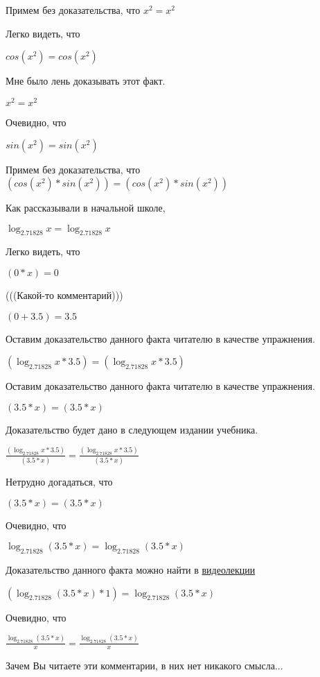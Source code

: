 \documentclass[12pt,a4paper,fleqn]{article}
\theoremstyle{definition}
\begin{document}
Примем без доказательства, что
${ x }^{ 2 } = { x }^{ 2 }$

Легко видеть, что

$cos({ x }^{ 2 }) = cos({ x }^{ 2 })$

Мне было лень доказывать этот факт.

${ x }^{ 2 } = { x }^{ 2 }$

Очевидно, что

$sin({ x }^{ 2 }) = sin({ x }^{ 2 })$

Примем без доказательства, что
$(cos({ x }^{ 2 }) * sin({ x }^{ 2 })) = (cos({ x }^{ 2 }) * sin({ x }^{ 2 }))$

Как рассказывали в начальной школе,

$\log_{ 2.71828 }{ x } = \log_{ 2.71828 }{ x }$

Легко видеть, что

$( 0  *  x ) =  0 $

(((Какой-то комментарий)))

$( 0  +  3.5 ) =  3.5 $

Оставим доказательство данного факта читателю в качестве упражнения.

$(\log_{ 2.71828 }{ x } *  3.5 ) = (\log_{ 2.71828 }{ x } *  3.5 )$

Оставим доказательство данного факта читателю в качестве упражнения.

$( 3.5  *  x ) = ( 3.5  *  x )$

Доказательство будет дано в следующем издании учебника.

$\frac{(\log_{ 2.71828 }{ x } *  3.5 )}{( 3.5  *  x )}
 = \frac{(\log_{ 2.71828 }{ x } *  3.5 )}{( 3.5  *  x )}
$

Нетрудно догадаться, что

$( 3.5  *  x ) = ( 3.5  *  x )$

Очевидно, что

$\log_{ 2.71828 }{( 3.5  *  x )} = \log_{ 2.71828 }{( 3.5  *  x )}$

Доказательство данного факта можно найти в \href{https://www.youtube.com/watch?v=dQw4w9WgXcQ}{видеолекции}

$(\log_{ 2.71828 }{( 3.5  *  x )} *  1 ) = \log_{ 2.71828 }{( 3.5  *  x )}$

Очевидно, что

$\frac{\log_{ 2.71828 }{( 3.5  *  x )}}{ x }
 = \frac{\log_{ 2.71828 }{( 3.5  *  x )}}{ x }
$

Зачем Вы читаете эти комментарии, в них нет никакого смысла...
\end{document}
